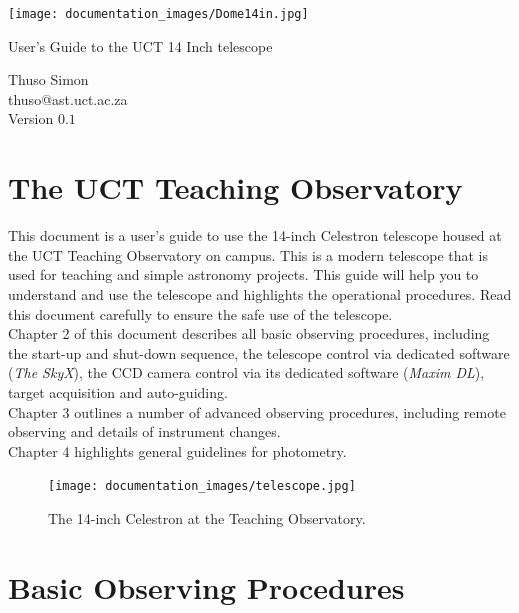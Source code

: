 \documentclass[12pt,twoside,a4paper]{report}
\begin{document}
\begin{titlepage}

\centering
 \texttt{[image: documentation\_images/Dome14in.jpg]}

\vspace{2cm}
{\Huge User's Guide to the UCT 14 Inch telescope}

\vspace{1cm}

{\small
Thuso Simon \\
thuso@ast.uct.ac.za \\
Version $0.1$}

\end{titlepage}

\tableofcontents


\chapter{The UCT Teaching Observatory}

This document is a user's guide to use the 14-inch Celestron telescope housed at the UCT Teaching Observatory
on campus. This is a modern telescope that is used for teaching and simple astronomy projects. This guide will 
help you to understand and use the telescope and highlights the operational procedures. Read this document
carefully to ensure the safe use of the telescope.\\

Chapter 2 of this document describes all basic observing procedures, including the start-up and shut-down sequence,
the telescope control via dedicated software (\emph{The SkyX}), the CCD camera control via its dedicated
software (\emph{Maxim DL}), target acquisition and auto-guiding.\\

Chapter 3 outlines a number of advanced observing procedures, including remote observing and details of 
instrument changes.\\

Chapter 4 highlights general guidelines for photometry.\\

\begin{figure}[h]
 \centering
    \texttt{[image: documentation\_images/telescope.jpg]}
    \caption{\label{fig:telescope} The 14-inch Celestron at the Teaching Observatory.}
\end{figure}

\vfill \eject

\chapter{Basic Observing Procedures}
\end{document}
